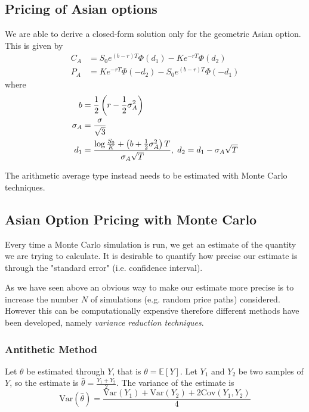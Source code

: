 \subsection{Pricing of Asian options}
We are able to derive a closed-form solution only for the geometric Asian option.
This is given by 
\begin{equation}
\begin{aligned}
C_A&=S_{0}e^{(b-r)T}\Phi (d_{1})-Ke^{-rT}\Phi (d_{2})\\
P_A&=Ke^{-rT}\Phi (-d_{2})-S_{0}e^{(b-r)T}\Phi (-d_{1})
\end{aligned}
\end{equation}
where 
\begin{equation}
\begin{aligned}
b&={1 \over {2}}\left(r-{1 \over {2}}\sigma _A^{2}\right)\\
\sigma _A&={\sigma  \over {\sqrt {3}}} \\
d_1&={\log {S_0 \over {K}}+\left(b+{1 \over {2}}\sigma _A^2\right)T \over {\sigma_A{\sqrt {T}}}},\;d_{2}=d_1-\sigma_A{\sqrt {T}}
\end{aligned}
\end{equation}

The arithmetic average type instead needs to be estimated with Monte Carlo techniques.

\subsection{Asian Option Pricing with Monte Carlo}

Every time a Monte Carlo simulation is run, we get an estimate of the quantity we are trying to calculate. It is desirable to quantify how precise our estimate is through the "standard error" (i.e. confidence interval).

As we have seen above an obvious way to make our estimate more precise is to increase the number $N$ of simulations (e.g. random price paths) considered. However this can be computationally expensive therefore different methods have been developed, namely \emph{variance reduction techniques}.

\subsubsection{Antithetic Method}
Let $\theta$ be estimated through $Y$, that is $\theta=\mathbb{E}[Y]$. Let $Y_1$ and $Y_2$ be two samples of $Y$, so the estimate is $\hat{\theta}=\frac{Y_1+Y_2}{2}$. The variance of the estimate is 
\begin{equation*}
\text{Var}(\hat{\theta}) = \frac{\text{Var}(Y_1)+\text{Var}(Y_2)+2\text{Cov}(Y_1,Y_2)}{4}
\end{equation*}

